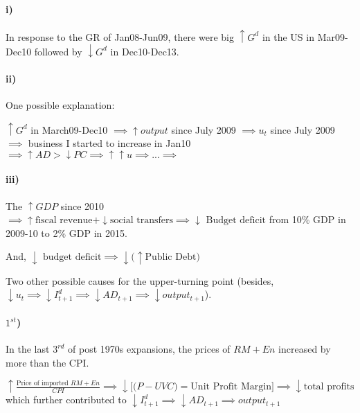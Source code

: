 \documentclass{report}
\begin{document}
\paragraph{i)} In response to the GR of Jan08-Jun09, there were big $\uparrow G^d$ in the US in Mar09-Dec10 followed by $\downarrow G^d$ in Dec10-Dec13.

\paragraph{ii)} One possible explanation:

$\uparrow G^d$ in March09-Dec10 $\implies \uparrow output$ since July 2009 $\implies u_t$ since July 2009 $\implies$ business I started to increase in Jan10 $\implies \uparrow AD>\downarrow PC \implies \uparrow \uparrow u \implies ... \implies $

\begin{figure}[!h]
    \centering
{}
\end{figure}

\paragraph{iii)} The $\uparrow GDP$ since 2010 $\implies \uparrow \text{fiscal revenue} + \downarrow \text{social transfers} \implies \downarrow \text{ Budget deficit}$ from 10\% GDP in 2009-10 to 2\% GDP in 2015. 

And, $\downarrow \text{ budget deficit} \implies \downarrow \bigg (\uparrow \text{Public Debt} \bigg)$

Two other possible causes for the upper-turning point (besides, $\downarrow u_t \implies \downarrow I^d_{t+1} \implies \downarrow AD_{t+1} \implies \downarrow output_{t+1}$). 

\paragraph{$1^{st}$)} In the last $3^{rd}$ of post 1970s expansions, the prices of $RM+En$ increased by more than the CPI.

$\uparrow \frac{\text{Price of imported }RM+En}{CPI} \implies \downarrow \big[ \big(P-UVC \big)=\text{Unit Profit Margin} \big] \implies \downarrow \text{total profits}$ which further contributed to $\downarrow I_{t+1}^d \implies \downarrow AD_{t+1} \implies output_{t+1}$
\end{document}
